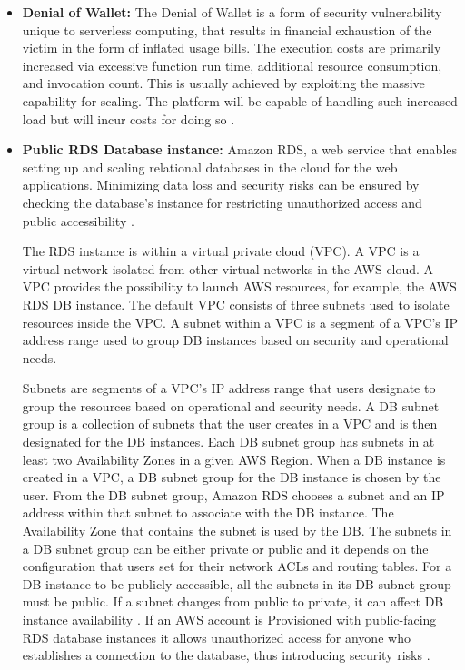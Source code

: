 \begin{itemize}
    \item \textbf{Denial of Wallet:} The Denial of Wallet is a form of security vulnerability unique to serverless
    computing,
    that results in financial exhaustion of the victim in the form of inflated usage bills.
    The execution costs are
    primarily increased via excessive function run time, additional resource consumption, and invocation count.
    This
    is usually achieved by exploiting the massive capability for scaling.
    The platform will be capable of handling
    such increased load but will incur costs for doing so \cite{54} \cite{55} \cite{56}.
\end{itemize}

\begin{itemize}
    \item \textbf{Public RDS Database instance:} Amazon RDS, a web service that enables setting up and scaling
    relational databases in the cloud for the web applications.
    Minimizing data loss and security risks can be
    ensured by checking the database’s instance for restricting unauthorized access and public accessibility \cite{57}.

    The RDS instance is within a virtual private cloud (VPC).
    A VPC is a virtual network isolated from other virtual networks in the AWS cloud.
    A VPC provides the possibility to launch AWS resources, for example, the AWS RDS DB instance.
    The default VPC consists of three subnets used to isolate resources inside the VPC. A subnet within a VPC is a segment of a VPC's IP address range used to group DB instances based on security and operational needs.

    Subnets are segments of a VPC's IP address range that users designate to group the resources based on operational and security needs. A DB subnet group is a collection of subnets that the user creates in a VPC and is then designated for the DB instances. Each DB subnet group has subnets in at least two Availability Zones in a given AWS Region. When a DB instance is created in a VPC, a DB subnet group for the DB instance is chosen by the user. From the DB subnet group, Amazon RDS chooses a subnet and an IP address within that subnet to associate with the DB instance. The Availability Zone that contains the subnet is used by the DB. The subnets in a DB subnet group can be either private or public and it depends on the configuration that users set for their network ACLs and routing tables. For a DB instance to be publicly accessible, all the subnets in its DB subnet group must be public. If a subnet changes from public to private, it can affect DB instance availability \cite{58}. If an AWS account is Provisioned with public-facing RDS database instances it allows unauthorized access for anyone who establishes a connection to the database, thus introducing security risks \cite{59}.
\end{itemize}

